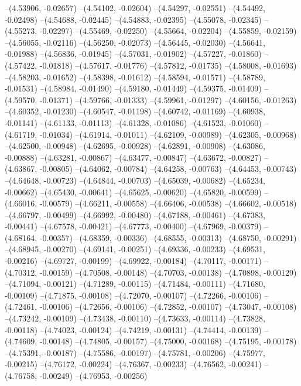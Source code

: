 --(4.53906, -0.02657)
--(4.54102, -0.02604)
--(4.54297, -0.02551)
--(4.54492, -0.02498)
--(4.54688, -0.02445)
--(4.54883, -0.02395)
--(4.55078, -0.02345)
--(4.55273, -0.02297)
--(4.55469, -0.02250)
--(4.55664, -0.02204)
--(4.55859, -0.02159)
--(4.56055, -0.02116)
--(4.56250, -0.02073)
--(4.56445, -0.02030)
--(4.56641, -0.01988)
--(4.56836, -0.01945)
--(4.57031, -0.01902)
--(4.57227, -0.01860)
--(4.57422, -0.01818)
--(4.57617, -0.01776)
--(4.57812, -0.01735)
--(4.58008, -0.01693)
--(4.58203, -0.01652)
--(4.58398, -0.01612)
--(4.58594, -0.01571)
--(4.58789, -0.01531)
--(4.58984, -0.01490)
--(4.59180, -0.01449)
--(4.59375, -0.01409)
--(4.59570, -0.01371)
--(4.59766, -0.01333)
--(4.59961, -0.01297)
--(4.60156, -0.01263)
--(4.60352, -0.01230)
--(4.60547, -0.01198)
--(4.60742, -0.01169)
--(4.60938, -0.01141)
--(4.61133, -0.01113)
--(4.61328, -0.01086)
--(4.61523, -0.01060)
--(4.61719, -0.01034)
--(4.61914, -0.01011)
--(4.62109, -0.00989)
--(4.62305, -0.00968)
--(4.62500, -0.00948)
--(4.62695, -0.00928)
--(4.62891, -0.00908)
--(4.63086, -0.00888)
--(4.63281, -0.00867)
--(4.63477, -0.00847)
--(4.63672, -0.00827)
--(4.63867, -0.00805)
--(4.64062, -0.00784)
--(4.64258, -0.00763)
--(4.64453, -0.00743)
--(4.64648, -0.00723)
--(4.64844, -0.00703)
--(4.65039, -0.00682)
--(4.65234, -0.00662)
--(4.65430, -0.00641)
--(4.65625, -0.00620)
--(4.65820, -0.00599)
--(4.66016, -0.00579)
--(4.66211, -0.00558)
--(4.66406, -0.00538)
--(4.66602, -0.00518)
--(4.66797, -0.00499)
--(4.66992, -0.00480)
--(4.67188, -0.00461)
--(4.67383, -0.00441)
--(4.67578, -0.00421)
--(4.67773, -0.00400)
--(4.67969, -0.00379)
--(4.68164, -0.00357)
--(4.68359, -0.00336)
--(4.68555, -0.00313)
--(4.68750, -0.00291)
--(4.68945, -0.00270)
--(4.69141, -0.00251)
--(4.69336, -0.00233)
--(4.69531, -0.00216)
--(4.69727, -0.00199)
--(4.69922, -0.00184)
--(4.70117, -0.00171)
--(4.70312, -0.00159)
--(4.70508, -0.00148)
--(4.70703, -0.00138)
--(4.70898, -0.00129)
--(4.71094, -0.00121)
--(4.71289, -0.00115)
--(4.71484, -0.00111)
--(4.71680, -0.00109)
--(4.71875, -0.00108)
--(4.72070, -0.00107)
--(4.72266, -0.00106)
--(4.72461, -0.00106)
--(4.72656, -0.00106)
--(4.72852, -0.00107)
--(4.73047, -0.00108)
--(4.73242, -0.00109)
--(4.73438, -0.00110)
--(4.73633, -0.00114)
--(4.73828, -0.00118)
--(4.74023, -0.00124)
--(4.74219, -0.00131)
--(4.74414, -0.00139)
--(4.74609, -0.00148)
--(4.74805, -0.00157)
--(4.75000, -0.00168)
--(4.75195, -0.00178)
--(4.75391, -0.00187)
--(4.75586, -0.00197)
--(4.75781, -0.00206)
--(4.75977, -0.00215)
--(4.76172, -0.00224)
--(4.76367, -0.00233)
--(4.76562, -0.00241)
--(4.76758, -0.00249)
--(4.76953, -0.00256)
